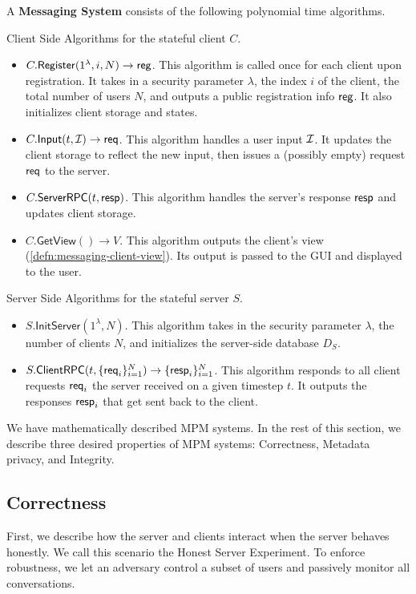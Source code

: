 \begin{definition}
\label{defn:messaging-scheme}
A \textbf{Messaging System} consists of the following polynomial time algorithms.

Client Side Algorithms for the stateful client $C$.
\begin{itemize}
    \item $C.\mathsf{Register}(1^{\lambda}, i, N) \to \mathsf{reg}$. This algorithm is called once for each client upon registration. It takes in a security parameter $\lambda$, the index $i$ of the client, the total number of users $N$, and outputs a public registration info $\mathsf{reg}$. It also initializes client storage and states.
    
    \item $C.\mathsf{Input}(t, \mathcal{I}) \to \mathsf{req}$. This algorithm handles a user input $\mathcal{I}$. It updates the client storage to reflect the new input, then issues a (possibly empty) request $\mathsf{req}$ to the server.
    
    \item $C.\mathsf{ServerRPC}(t, \mathsf{resp})$. This algorithm handles the server's response $\mathsf{resp}$ and updates client storage.
    
    \item $C.\mathsf{GetView}() \to V$. This algorithm outputs the client's view (\cref{defn:messaging-client-view}). Its output is passed to the GUI and displayed to the user.
\end{itemize}

Server Side Algorithms for the stateful server $S$.

\begin{itemize}
    \item $S.\mathsf{InitServer}(1^{\lambda}, N)$. This algorithm takes in the security parameter $\lambda$, the number of clients $N$, and initializes the server-side database $D_S$.
    \item $S.\mathsf{ClientRPC}(t, \{\mathsf{req}_i\}_{i = 1}^N) \to \{\mathsf{resp}_i\}_{i = 1}^N$. This algorithm responds to all client requests $\mathsf{req}_i$ the server received on a given timestep $t$. It outputs the responses $\mathsf{resp}_i$ that get sent back to the client.
\end{itemize}
\end{definition}

We have mathematically described MPM systems. In the rest of this section, we describe three desired properties of MPM systems: Correctness, Metadata privacy, and Integrity.

\subsection{Correctness}
\label{subsec:messaging-correctness}
First, we describe how the server and clients interact when the server behaves honestly. We call this scenario the Honest Server Experiment. To enforce robustness, we let an adversary control a subset of users and passively monitor all conversations.

